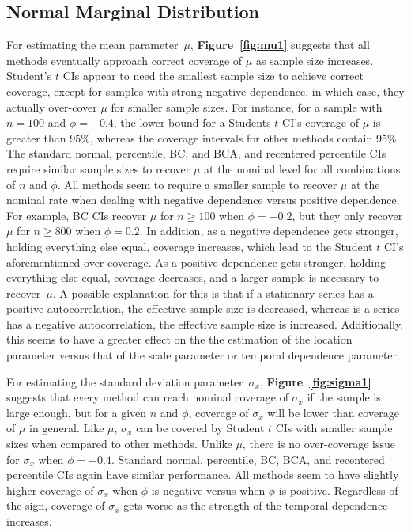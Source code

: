 \documentclass[10pt]{article}
\begin{document}
\subsection*{Normal Marginal Distribution}
For estimating the mean parameter~$\mu$, \textbf{Figure~\ref{fig:mu1}} suggests 
that all methods eventually approach correct coverage of $\mu$ as sample size 
increases. Student's $t$ CIs appear to need the smallest sample size to achieve 
correct coverage, except for samples with strong negative dependence, in which 
case, they actually over-cover $\mu$ for smaller sample sizes. For instance, for 
a sample with $n = 100$ and $\phi = -0.4$, the lower bound for a Students $t$ 
CI's coverage of $\mu$ is greater than 95\%, whereas the coverage intervals for 
other methods contain 95\%. The standard normal, percentile, BC, and BCA, and 
recentered percentile CIs require similar sample sizes to recover $\mu$ at the 
nominal level for all combinations of $n$ and $\phi$. All methods seem to 
require a smaller sample to recover $\mu$ at the nominal rate when dealing with 
negative dependence versus positive dependence. For example, BC CIs recover 
$\mu$ for $n \geq 100$ when $\phi = -0.2$, but they only recover $\mu$ for 
$n \geq 800$ when $\phi = 0.2$. In addition, as a negative dependence gets 
stronger, holding everything else equal, coverage increases, which lead to the 
Student $t$ CI's aforementioned over-coverage. As a positive dependence gets 
stronger, holding everything else equal, coverage decreases, and a larger sample 
is necessary to recover~$\mu$. A possible explanation for this is that if a 
stationary series has a positive 
autocorrelation, the effective sample
size is decreased, whereas is a series has a negative autocorrelation, the
effective sample size is increased. Additionally, this seems to have a 
greater effect on the the estimation of the location parameter versus that
of the scale parameter or temporal dependence parameter.


For estimating the standard deviation parameter~$\sigma_x$,
\textbf{Figure~\ref{fig:sigma1}} suggests that every method can reach nominal 
coverage of $\sigma_x$ if the sample is large enough, but for a given $n$ and 
$\phi$, coverage of $\sigma_x$ will be lower than coverage of $\mu$ in general.
Like $\mu$, $\sigma_x$ can be covered by Student $t$ CIs with smaller sample 
sizes when compared to other methods. Unlike $\mu$, there is no over-coverage 
issue for $\sigma_x$ when $\phi = -0.4$. Standard normal, percentile, BC, BCA, and 
recentered percentile CIs again have similar performance. All methods seem to 
have slightly higher coverage of $\sigma_x$ when $\phi$ is negative versus when 
$\phi$ is positive. Regardless of the sign, coverage of $\sigma_x$ gets worse as 
the strength of the temporal dependence increases.
\end{document}
